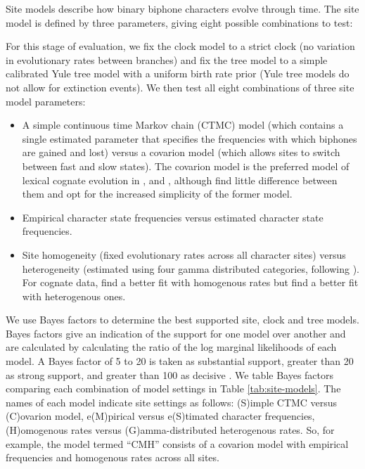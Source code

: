 Site models describe how binary biphone characters evolve through time. The site model is defined by three parameters, giving eight possible combinations to test:

For this stage of evaluation, we fix the clock model to a strict clock (no variation in evolutionary rates between branches) and fix the tree model to a simple calibrated Yule tree model with a uniform birth rate prior (Yule tree models do not allow for extinction events). We then test all eight combinations of three site model parameters:

\begin{itemize}
\tightlist
\item
  A simple continuous time Markov chain (CTMC) model (which contains a single estimated parameter that specifies the frequencies with which biphones are gained and lost) versus a covarion model (which allows sites to switch between fast and slow states). The covarion model is the preferred model of lexical cognate evolution in \textcite{bouckaert_corrections_2012}, \textcite{bouckaert_origin_2018} and \textcite{kolipakam_bayesian_2018}, although \textcite[p.~219]{chang_ancestry-constrained_2015} find little difference between them and opt for the increased simplicity of the former model.
\item
  Empirical character state frequencies versus estimated character state frequencies.
\item
  Site homogeneity (fixed evolutionary rates across all character sites) versus heterogeneity (estimated using four gamma distributed categories, following \textcite{kolipakam_bayesian_2018}). For cognate data, \textcite{bouckaert_origin_2018} find a better fit with homogenous rates but \textcite{kolipakam_bayesian_2018} find a better fit with heterogenous ones.
\end{itemize}

We use Bayes factors \autocite{kass_bayes_1995} to determine the best supported site, clock and tree models. Bayes factors give an indication of the support for one model over another and are calculated by calculating the ratio of the log marginal likelihoods of each model. A Bayes factor of 5 to 20 is taken as substantial support, greater than 20 as strong support, and greater than 100 as decisive \autocite{kass_bayes_1995}. We table Bayes factors comparing each combination of model settings in Table \ref{tab:site-models}. The names of each model indicate site settings as follows: (S)imple CTMC versus (C)ovarion model, e(M)pirical versus e(S)timated character frequencies, (H)omogenous rates versus (G)amma-distributed heterogenous rates. So, for example, the model termed ``CMH'' consists of a covarion model with empirical frequencies and homogenous rates across all sites.

